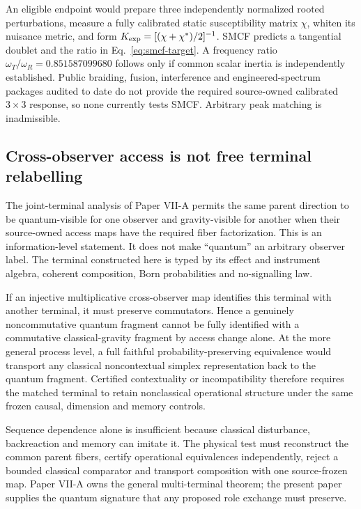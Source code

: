 \documentclass[11pt]{article}
\begin{document}
An eligible endpoint would prepare three independently normalized rooted
perturbations, measure a fully calibrated static susceptibility matrix
$\chi$, whiten its nuisance metric, and form
$K_{\rm exp}=[(\chi+\chi^*)/2]^{-1}$.  SMCF predicts a tangential doublet and
the ratio in Eq.~\eqref{eq:smcf-target}.  A frequency ratio
$\omega_T/\omega_R=0.851587099680$ follows only if common scalar inertia is
independently established.  Public braiding, fusion, interference and
engineered-spectrum packages audited to date do not provide the required
source-owned calibrated $3\times3$ response, so none currently tests SMCF.
Arbitrary peak matching is inadmissible.

\subsection{Cross-observer access is not free terminal relabelling}

The joint-terminal analysis of Paper VII-A permits the same parent direction
to be quantum-visible for one observer and gravity-visible for another when
their source-owned access maps have the required fiber factorization. This is
an information-level statement. It does not make ``quantum'' an arbitrary
observer label. The terminal constructed here is typed by its effect and
instrument algebra, coherent composition, Born probabilities and
no-signalling law.

If an injective multiplicative cross-observer map identifies this terminal
with another terminal, it must preserve commutators. Hence a genuinely
noncommutative quantum fragment cannot be fully identified with a commutative
classical-gravity fragment by access change alone. At the more general process
level, a full faithful probability-preserving equivalence would transport any
classical noncontextual simplex representation back to the quantum fragment.
Certified contextuality or incompatibility therefore requires the matched
terminal to retain nonclassical operational structure under the same frozen
causal, dimension and memory controls.

Sequence dependence alone is insufficient because classical disturbance,
backreaction and memory can imitate it. The physical test must reconstruct
the common parent fibers, certify operational equivalences independently,
reject a bounded classical comparator and transport composition with one
source-frozen map. Paper VII-A owns the general multi-terminal theorem; the
present paper supplies the quantum signature that any proposed role exchange
must preserve.
\end{document}

